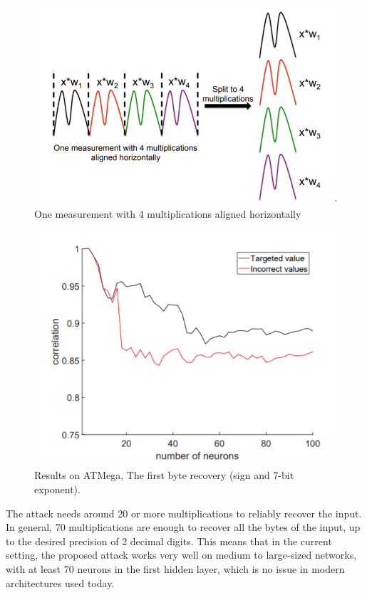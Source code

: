 \begin{figure}
    \centering
    \includegraphics[scale=0.5]{images/chapter8/hpa.PNG}
   \caption{One measurement with 4 multiplications
aligned horizontally }
\end{figure}

\begin{figure}
    \centering
    \includegraphics[scale=0.5]{images/chapter8/results.PNG}
    \caption{ Results on ATMega,
The first byte recovery (sign and 7-bit exponent).}
\end{figure}

The attack needs around 20 or more multiplications to reliably recover the input. In general, 70 multiplications are enough to recover all the bytes of the input, up to the desired precision of 2 decimal digits. This means that in the current setting, the proposed attack works very well on medium to large-sized networks, with at least 70 neurons in the first hidden layer, which is no issue in modern architectures used today.

